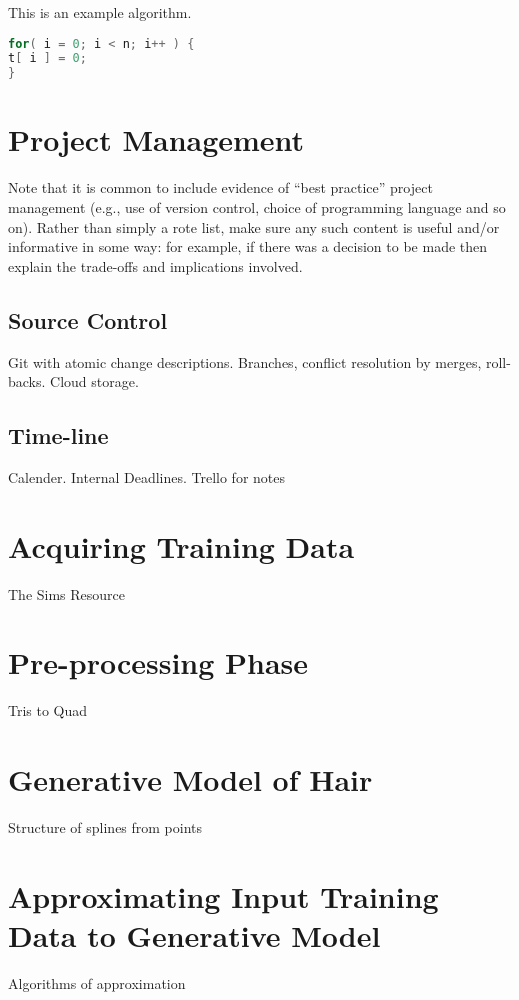 \documentclass[ %
                    author={Dillon Keith Diep [INCOMPLETE DRAFT, NOT FOR SUBMISSION]},
                supervisor={Dr. Carl Henrik Ek},
                    degree={MEng},
                     title={ART-CG:},
                  subtitle={Assisted Real-Time Content Generation of 3D Hair Geometry},
                      type={Research},
                      year={2014} ]{dissertation}
\begin{document}
\begin{algorithm}[!h]
	\caption{This is an example algorithm.}
	\label{alg}
\end{algorithm}

\begin{lstlisting}[float={!h},caption={This is an example listing.},label={lst},language=C]
for( i = 0; i < n; i++ ) {
t[ i ] = 0;
}
\end{lstlisting}

\section{Project Management}
{\color{red}
Note that it is common to include evidence of ``best practice'' project 
management (e.g., use of version control, choice of programming language 
and so on).  Rather than simply a rote list, make sure any such content 
is useful and/or informative in some way: for example, if there was a 
decision to be made then explain the trade-offs and implications 
involved.
}

\subsection{Source Control}
Git with atomic change descriptions. Branches, conflict resolution by merges, roll-backs. Cloud storage.

\subsection{Time-line}
Calender.
Internal Deadlines.
Trello for notes

\section{Acquiring Training Data}
The Sims Resource
\section{Pre-processing Phase}
Tris to Quad

\section{Generative Model of Hair}
Structure of splines from points

\section{Approximating Input Training Data to Generative Model}
Algorithms of approximation
\end{document}
